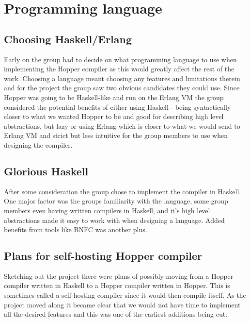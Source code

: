 \section{Programming language}



\subsection{Choosing Haskell/Erlang}

Early on the group had to decide on what programming language to use when implementing the Hopper compiler as this would greatly affect the rest of the work. Choosing a language meant choosing any features and limitations therein and for the project the group saw two obvious candidates they could use. Since Hopper was going to be Haskell-like and run on the Erlang VM the group considered the potential benefits of either using Haskell - being syntactically closer to what we wanted Hopper to be and good for describing high level abstractions, but lazy or using Erlang which is closer to what we would send to Erlang VM and strict but less intuitive for the group members to use when designing the compiler.


\subsection{Glorious Haskell}

After some consideration the group chose to implement the compiler in Haskell. One major factor was the groups familiarity with the language, some group members even having written compilers in Haskell, and it's high level abstractions made it easy to work with when designing a language. Added benefits from tools like BNFC was another plus.

\subsection{Plans for self-hosting Hopper compiler}

Sketching out the project there were plans of possibly moving from a Hopper compiler written in Haskell to a Hopper compiler written in Hopper. This is sometimes called a self-hosting compiler since it would then compile itself. As the project moved along it became clear that we would not have time to implement all the desired features and this was one of the earliest additions being cut.
